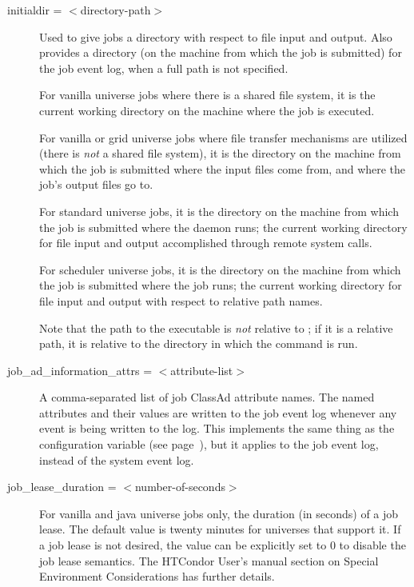 \begin{description}

\label{man-condor-submit-initialdir}
\item[initialdir = $<$directory-path$>$] 
Used to give jobs a directory with respect to file input and output.
Also provides a directory 
(on the machine from which the job is submitted)
for the job event log, when a full path is not specified. 

For vanilla universe jobs where there is a shared file system,
it is the current working directory on the machine where the
job is executed.

For vanilla or grid universe jobs where file transfer mechanisms are
utilized (there is \emph{not} a shared file system),
it is the directory on the machine from which the job is submitted
where the input files come from, and where the job's output
files go to.

For standard universe jobs,
it is the directory on the machine from which the job is submitted
where the  daemon runs;
the current working directory for file input and output accomplished
through remote system calls.

For scheduler universe jobs,
it is the directory on the machine from which the job is submitted
where the job runs;
the current working directory for file input and output with
respect to relative path names.

Note that the path to the executable is \emph{not} relative to
; if it is a relative path, it is relative to the
directory in which the  command is run.


\label{man-condor-submit-job-ad-information-attrs}
\item[job\_ad\_information\_attrs =  $<$attribute-list$>$]
A comma-separated list of job ClassAd attribute names.
The named attributes and their values are written to the job event log
whenever any event is being written to the log.
This implements the same thing as the configuration variable
 (see
page~\pageref{param:EventLogJobAdInformationAttrs}),
but it applies to the job event log, instead of the system event log.


\label{condor-submit-job-lease-duration}
\item[job\_lease\_duration = $<$number-of-seconds$>$] For vanilla
and java universe jobs only, the duration (in seconds) of a
job lease.
The default value is twenty minutes for universes that support it.
If a job lease is not desired, the value can be explicitly set to 0 to
disable the job lease semantics.
The HTCondor User's manual section on Special Environment Considerations
has further details.


\end{description}
